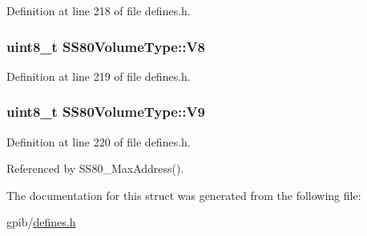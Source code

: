 Definition at line 218 of file defines.\+h.

\subsubsection[{\texorpdfstring{V8}{V8}}]{\setlength{\rightskip}{0pt plus 5cm}uint8\+\_\+t S\+S80\+Volume\+Type\+::\+V8}\hypertarget{structSS80VolumeType_a0859b6387f103bf2c3aee91d8786f4a8}{}\label{structSS80VolumeType_a0859b6387f103bf2c3aee91d8786f4a8}


Definition at line 219 of file defines.\+h.

\subsubsection[{\texorpdfstring{V9}{V9}}]{\setlength{\rightskip}{0pt plus 5cm}uint8\+\_\+t S\+S80\+Volume\+Type\+::\+V9}\hypertarget{structSS80VolumeType_aeea3a5985e301877bb9011e2df62b427}{}\label{structSS80VolumeType_aeea3a5985e301877bb9011e2df62b427}


Definition at line 220 of file defines.\+h.



Referenced by S\+S80\+\_\+\+Max\+Address().



The documentation for this struct was generated from the following file\+:\begin{DoxyCompactItemize}
\item 
gpib/\hyperlink{defines_8h}{defines.\+h}\end{DoxyCompactItemize}
